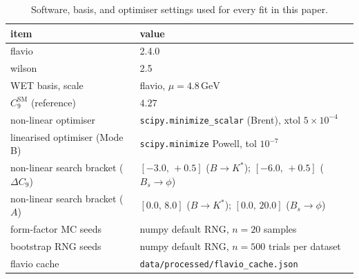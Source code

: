 \begin{table}[h]
\centering
\small
\begin{tabular}{ll}
\toprule
item & value \\
\midrule
flavio & 2.4.0 \\
wilson & 2.5 \\
WET basis, scale & flavio, $\mu = 4.8\,\mathrm{GeV}$ \\
$C_{9}^{\mathrm{SM}}$ (reference) & $4.27$ \\
non-linear optimiser & \texttt{scipy.minimize\_scalar} (Brent), xtol $5\!\times\!10^{-4}$ \\
linearised optimiser (Mode B) & \texttt{scipy.minimize} Powell, tol $10^{-7}$ \\
non-linear search bracket ($\Delta C_{9}$) & $[-3.0,\,+0.5]$ ($B\!\to\!K^{*}$); $[-6.0,\,+0.5]$ ($B_{s}\!\to\!\phi$) \\
non-linear search bracket ($A$) & $[0.0,\,8.0]$ ($B\!\to\!K^{*}$); $[0.0,\,20.0]$ ($B_{s}\!\to\!\phi$) \\
form-factor MC seeds & numpy default RNG, $n=20$ samples \\
bootstrap RNG seeds & numpy default RNG, $n=500$ trials per dataset \\
flavio cache & \texttt{data/processed/flavio\_cache.json} \\
\bottomrule
\end{tabular}
\caption{Software, basis, and optimiser settings used for every fit
in this paper.}
\label{tab:repro_ledger}
\end{table}
